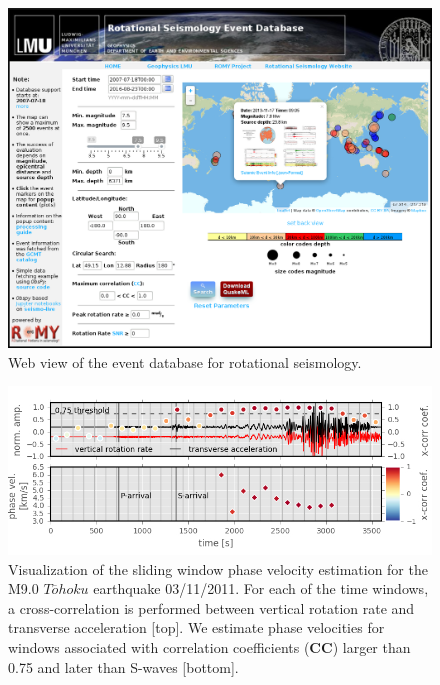 \documentclass[12pt,reqno,letter]{article}
\begin{document}
\begin{figure}[!htp]
\centering
\includegraphics[width=\textwidth]{webpage.jpg}
\caption{Web view of the event database for rotational seismology.}
\label{fig:website}
\end{figure}

\begin{figure}[!htp]
\centering
\includegraphics[width=\textwidth]{Vp_estimation.jpg}
\caption{Visualization of the sliding window phase velocity estimation for the M9.0 $T\overline{o}hoku$ earthquake 03/11/2011. For each of the time windows, a cross-correlation is performed between vertical rotation rate and transverse acceleration [top]. We estimate phase velocities for windows associated with correlation coefficients (\textbf{CC}) larger than 0.75 and later than S-waves [bottom].}
\label{fig:phase_vel}
\end{figure}
\end{document}
